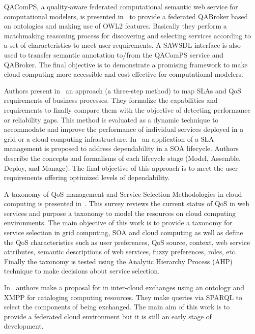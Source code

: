 QAComPS, a quality-aware federated computational semantic web service for 
computational  modelers, is presented in~\cite{dewqacomps} to provide a 
federated QABroker based on ontologies and making use of OWL2 features. 
Basically they perform a matchmaking reasoning process for discovering and 
selecting services according to a set of characteristics to meet user 
requirements. A SAWSDL interface is also used to transfer semantic annotation 
to/from the QAComPS service and QABroker. The final objective is to demonstrate 
a promising framework to make cloud computing more accessible and cost effective 
for computational modelers.

Authors present in~\cite{stantchev2009negotiating} an approach (a three-step method) 
to map SLAs and QoS requirements of business processes. They formalize the capabilities 
and requirements to finally compare them with the objective of detecting performance 
or reliability gaps. This method is evaluated as a dynamic technique to accommodate 
and improve the performance of individual services deployed in a grid or 
a cloud computing infrastructure. In~\cite{stantchev2011addressing} 
an application of a SLA management is proposed to address dependability in 
a SOA lifecycle. Authors describe the concepts and formalisms of each 
lifecycle stage (Model, Assemble, Deploy, and Manage). The final objective 
of this approach is to meet the user requirements offering optimized levels 
of dependability.


A taxonomy of QoS management and Service Selection Methodologies in cloud 
computing is presented in~\cite{qos-taxonomy}. This survey reviews the current 
status of QoS in web services and purpose a taxonomy to model the resources on 
cloud computing environments. The main objective of this work is to provide a 
taxonomy for service selection in grid computing, SOA and cloud computing as 
well as define the QoS characteristics such as user preferences, QoS source, 
context, web service attributes, semantic descriptions of web services, fuzzy 
preferences, roles, etc. Finally the taxonomy is tested using the Analytic 
Hierarchy Process (AHP) technique to make decisions about service selection.

In~\cite{DBLP:conf/ic/BernsteinV10} authors make a proposal for in inter-cloud 
exchanges using an ontology and XMPP for cataloging computing resources. They 
make queries via SPARQL to select the components of being exchanged. The main 
aim of this work is to provide a federated cloud environment but it is still an 
early stage of development.

